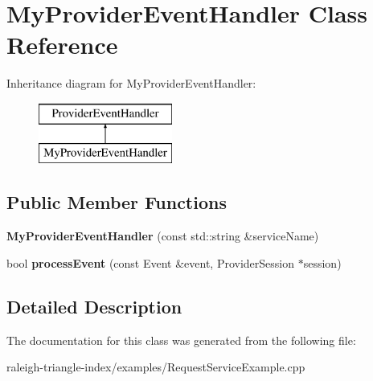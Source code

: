 \section{My\+Provider\+Event\+Handler Class Reference}
\label{class_my_provider_event_handler}
Inheritance diagram for My\+Provider\+Event\+Handler\+:\begin{figure}[H]
\begin{center}
\leavevmode
\includegraphics[height=2.000000cm]{d8/d10/class_my_provider_event_handler}
\end{center}
\end{figure}
\subsection*{Public Member Functions}
\begin{DoxyCompactItemize}
\item 
{\bfseries My\+Provider\+Event\+Handler} (const std\+::string \&service\+Name)\label{class_my_provider_event_handler_a32e30d95719355ef1e2891a674e369f6}

\item 
bool {\bfseries process\+Event} (const Event \&event, Provider\+Session $\ast$session)\label{class_my_provider_event_handler_a681d93678bdc3a574df6f6ecf9b6dae3}

\end{DoxyCompactItemize}


\subsection{Detailed Description}


The documentation for this class was generated from the following file\+:\begin{DoxyCompactItemize}
\item 
raleigh-\/triangle-\/index/examples/Request\+Service\+Example.\+cpp\end{DoxyCompactItemize}
